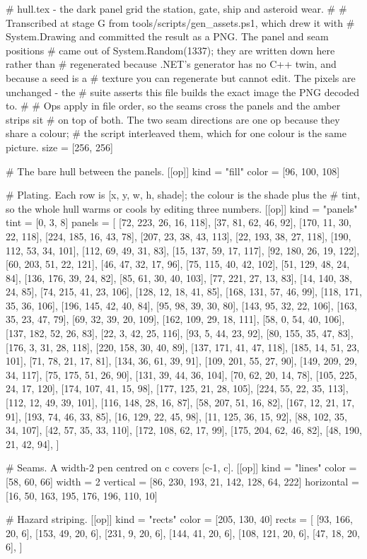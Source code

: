 # hull.tex - the dark panel grid the station, gate, ship and asteroid wear.
#
# Transcribed at stage G from tools/scripts/gen_assets.ps1, which drew it with
# System.Drawing and committed the result as a PNG. The panel and seam positions
# came out of System.Random(1337); they are written down here rather than
# regenerated because .NET's generator has no C++ twin, and because a seed is a
# texture you can regenerate but cannot edit. The pixels are unchanged - the
# suite asserts this file builds the exact image the PNG decoded to.
#
# Ops apply in file order, so the seams cross the panels and the amber strips sit
# on top of both. The two seam directions are one op because they share a colour;
# the script interleaved them, which for one colour is the same picture.
size = [256, 256]

# The bare hull between the panels.
[[op]]
kind = "fill"
color = [96, 100, 108]

# Plating. Each row is [x, y, w, h, shade]; the colour is the shade plus the
# tint, so the whole hull warms or cools by editing three numbers.
[[op]]
kind = "panels"
tint = [0, 3, 8]
panels = [
  [72, 223, 26, 16, 118],
  [37, 81, 62, 46, 92],
  [170, 11, 30, 22, 118],
  [224, 185, 16, 43, 78],
  [207, 23, 38, 43, 113],
  [22, 193, 38, 27, 118],
  [190, 112, 53, 34, 101],
  [112, 69, 49, 31, 83],
  [15, 137, 59, 17, 117],
  [92, 180, 26, 19, 122],
  [60, 203, 51, 22, 121],
  [46, 47, 32, 17, 96],
  [75, 115, 40, 42, 102],
  [51, 129, 48, 24, 84],
  [136, 176, 39, 24, 82],
  [85, 61, 30, 40, 103],
  [77, 221, 27, 13, 83],
  [14, 140, 38, 24, 85],
  [74, 215, 41, 23, 106],
  [128, 12, 18, 41, 85],
  [168, 131, 57, 46, 99],
  [118, 171, 35, 36, 106],
  [196, 145, 42, 40, 84],
  [95, 98, 39, 30, 80],
  [143, 95, 32, 22, 106],
  [163, 35, 23, 47, 79],
  [69, 32, 39, 20, 109],
  [162, 109, 29, 18, 111],
  [58, 0, 54, 40, 106],
  [137, 182, 52, 26, 83],
  [22, 3, 42, 25, 116],
  [93, 5, 44, 23, 92],
  [80, 155, 35, 47, 83],
  [176, 3, 31, 28, 118],
  [220, 158, 30, 40, 89],
  [137, 171, 41, 47, 118],
  [185, 14, 51, 23, 101],
  [71, 78, 21, 17, 81],
  [134, 36, 61, 39, 91],
  [109, 201, 55, 27, 90],
  [149, 209, 29, 34, 117],
  [75, 175, 51, 26, 90],
  [131, 39, 44, 36, 104],
  [70, 62, 20, 14, 78],
  [105, 225, 24, 17, 120],
  [174, 107, 41, 15, 98],
  [177, 125, 21, 28, 105],
  [224, 55, 22, 35, 113],
  [112, 12, 49, 39, 101],
  [116, 148, 28, 16, 87],
  [58, 207, 51, 16, 82],
  [167, 12, 21, 17, 91],
  [193, 74, 46, 33, 85],
  [16, 129, 22, 45, 98],
  [11, 125, 36, 15, 92],
  [88, 102, 35, 34, 107],
  [42, 57, 35, 33, 110],
  [172, 108, 62, 17, 99],
  [175, 204, 62, 46, 82],
  [48, 190, 21, 42, 94],
]

# Seams. A width-2 pen centred on c covers [c-1, c].
[[op]]
kind = "lines"
color = [58, 60, 66]
width = 2
vertical = [86, 230, 193, 21, 142, 128, 64, 222]
horizontal = [16, 50, 163, 195, 176, 196, 110, 10]

# Hazard striping.
[[op]]
kind = "rects"
color = [205, 130, 40]
rects = [
  [93, 166, 20, 6],
  [153, 49, 20, 6],
  [231, 9, 20, 6],
  [144, 41, 20, 6],
  [108, 121, 20, 6],
  [47, 18, 20, 6],
]
